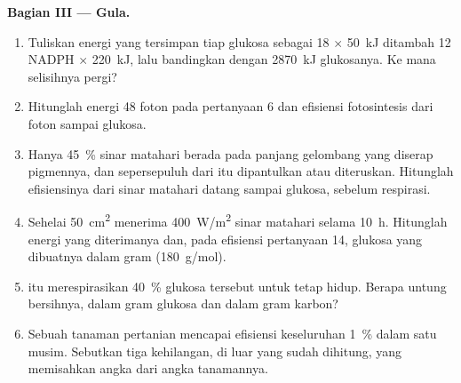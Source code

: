 \begin{problem}
\medskip
\noindent\textbf{Bagian III --- Gula.}
\begin{enumerate}[resume]
  \item Tuliskan energi yang tersimpan tiap glukosa sebagai 18 
        $\times$ \qty{50}{kJ} ditambah 12 NADPH $\times$ \qty{220}{kJ},
        lalu bandingkan dengan \qty{2870}{kJ} glukosanya. Ke mana
        selisihnya pergi?
  \item Hitunglah energi 48 foton pada pertanyaan 6 dan efisiensi
        fotosintesis dari foton sampai glukosa.
  \item Hanya \qty{45}{\%} sinar matahari berada pada panjang gelombang
        yang diserap pigmennya, dan sepersepuluh dari itu dipantulkan
        atau diteruskan. Hitunglah efisiensinya dari sinar matahari
        datang sampai glukosa, sebelum respirasi.
  \item Sehelai  \qty{50}{cm^2} menerima \qty{400}{W/m^2} sinar
        matahari selama \qty{10}{h}. Hitunglah energi yang diterimanya
        dan, pada efisiensi pertanyaan 14, glukosa yang dibuatnya dalam
        gram
        (\qty{180}{g/mol}).
  \item {} itu merespirasikan \qty{40}{\%} glukosa tersebut untuk
        tetap hidup. Berapa untung bersihnya, dalam gram glukosa dan
        dalam gram karbon?
  \item Sebuah tanaman pertanian mencapai efisiensi keseluruhan
        \qty{1}{\%} dalam satu musim. Sebutkan tiga kehilangan, di luar
        yang sudah dihitung, yang memisahkan angka  dari angka
        tanamannya.
\end{enumerate}


\end{problem}

